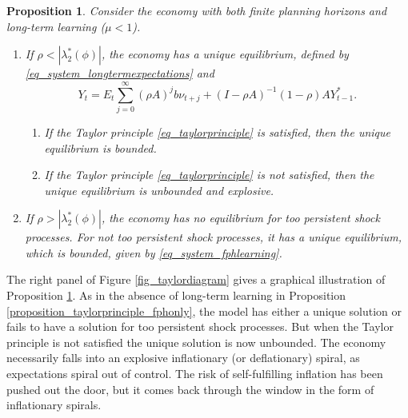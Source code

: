 \documentclass{article}
\newtheorem{proposition}{Proposition}
\begin{document}
\begin{proposition}\label{proposition_taylorprinciple}
	Consider the economy with both finite planning horizons and long-term learning ($\mu<1$).
\begin{enumerate}
	\item If $\rho<|\lambda_2^*(\phi)|$, the economy has a unique equilibrium, defined by \eqref{eq_system_longtermexpectations} and
	\begin{equation}
	Y_t = E_t \sum_{j=0}^{\infty} (\rho A)^j b \nu_{t+j}+ (I-\rho A)^{-1} (1-\rho) A Y_{t-1}^{*}.\label{eq_system_fphlearning}
	\end{equation}
\begin{enumerate}
	\item If the Taylor principle \eqref{eq_taylorprinciple} is satisfied, then the unique equilibrium is bounded.
	\item If the Taylor principle \eqref{eq_taylorprinciple} is not satisfied, then the unique equilibrium is unbounded and explosive.	
\end{enumerate}
\item If $\rho>|\lambda_2^*(\phi)|$, the economy has no equilibrium for too persistent shock processes. For not too persistent shock processes, it has a unique equilibrium, which is bounded, given by \eqref{eq_system_fphlearning}.
\end{enumerate}
\end{proposition}

The right panel of Figure \ref{fig_taylordiagram} gives a graphical illustration of Proposition \ref{proposition_taylorprinciple}. As in the absence of long-term learning in Proposition \ref{proposition_taylorprinciple_fphonly}, the model has either a unique solution or fails to have a solution for too persistent shock processes. But when the Taylor principle is not satisfied the unique solution is now unbounded. The economy necessarily falls into an explosive inflationary (or deflationary) spiral, as expectations spiral out of control. The risk of self-fulfilling inflation has been pushed out the door, but it comes back through the window in the form of inflationary spirals.
\end{document}
